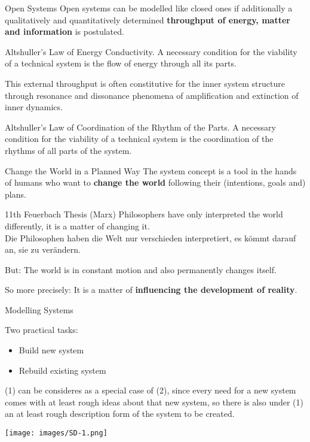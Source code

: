 \documentclass{beamer}
\begin{document}
\begin{frame}{Open Systems}
Open systems can be modelled like closed ones if additionally a qualitatively
and quantitatively determined \textbf{throughput of energy, matter and
  information} is postulated.

\begin{block}{Altshuller's Law of Energy Conductivity.}
  A necessary condition for the viability of a technical system is the flow of
  energy through all its parts.
\end{block}

This external throughput is often constitutive for the inner system structure
through resonance and dissonance phenomena of amplification and extinction of
inner dynamics.

\begin{block}{Altshuller's Law of Coordination of the Rhythm of the Parts.}
  A necessary condition for the viability of a technical system is the
  coordination of the rhythms of all parts of the system.
\end{block}
\end{frame}

\begin{frame}{Change the World in a Planned Way}
The system concept is a tool in the hands of humans who want to \textbf{change
  the world} following their (intentions, goals and) plans.

\begin{block}{11th Feuerbach Thesis (Marx)}
  Philosophers have only interpreted the world differently, it is a matter of
  changing it.\\[4pt] Die Philosophen haben die Welt nur verschieden
  interpretiert, es kömmt darauf an, sie zu verändern.
\end{block}

But: The world is in constant motion and also permanently changes itself.

So more precisely: It is a matter of \textbf{influencing the development of
  reality}.
\end{frame}

\begin{frame}{Modelling Systems}

Two practical tasks:
\begin{itemize}
\item[(1)] Build new system
\item[(2)] Rebuild existing system
\end{itemize}

(1) can be consideres as a special case of (2), since every need for a new
system comes with at least rough ideas about that new system, so there is also
under (1) an at least rough description form of the system to be created.

\begin{center}
  \texttt{[image: images/SD-1.png]}
\end{center}
\end{frame}
\end{document}
